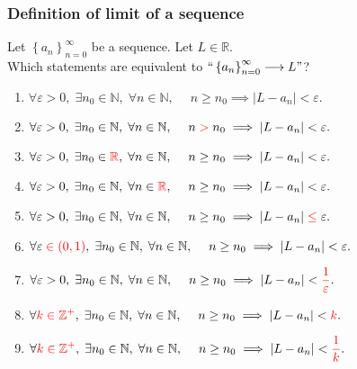 \documentclass[14pt]{beamer}
\begin{document}
	\begin{frame}[t]
		\fontsize{13}{13}\selectfont
		\frametitle{Definition of limit of a sequence}

		Let $\displaystyle \left\{ a_{n} \right\}_{n=0}^{\infty}$ be a sequence. Let
		$\displaystyle L \in \mathbb{R}$. \\ Which statements are equivalent to $\displaystyle
		``\left\{ a_{n} \right\}_{n=0}^{\infty}\longrightarrow L"$?

		\begin{enumerate}
			\item $\displaystyle \forall \varepsilon>0, \; \exists n_{0}\in \mathbb{N},
				\; \forall n \in \mathbb{N}, \; \quad n \geq n_{0}\implies |L-a_{n}| < \varepsilon
				.$

			\item $\displaystyle \forall \varepsilon>0, \; \exists n_{0}\in \mathbb{N},
				\; \forall n \in \mathbb{N}, \; \quad n \;{\color{red} > }\; n_{0}\implies
				|L-a_{n}| < \varepsilon.$

			\item $\displaystyle \forall \varepsilon>0, \; \exists n_{0}\in{\color{red} \mathbb{R}}
				, \; \forall n \in \mathbb{N}, \; \quad n \geq n_{0}\implies |L-a_{n}| <
				\varepsilon.$

			\item $\displaystyle \forall \varepsilon>0, \; \exists n_{0}\in \mathbb{N},
				\; \forall n \in{\color{red} \mathbb{R}}, \; \quad n \geq n_{0}\implies |
				L-a_{n}| < \varepsilon.$

			\item $\displaystyle \forall \varepsilon>0, \; \exists n_{0}\in \mathbb{N},
				\; \forall n \in \mathbb{N}, \; \quad n \geq n_{0}\implies |L-a_{n}| \;{\color{red} \leq}
				\; \varepsilon.$

			\item $\displaystyle \forall \varepsilon \;{\color{red} \in (0,1)}, \; \exists
				n_{0}\in \mathbb{N}, \; \forall n \in \mathbb{N}, \; \quad n \geq n_{0}\implies
				|L-a_{n}| < \varepsilon.$

			\item $\displaystyle \forall \varepsilon>0, \; \exists n_{0}\in \mathbb{N},
				\; \forall n \in \mathbb{N}, \; \quad n \geq n_{0}\implies |L-a_{n}| <{\color{red} \frac{1}{\varepsilon}}
				.$

			\item $\displaystyle \forall{\color{red} k \in \mathbb{Z}^{+}}, \; \exists
				n_{0}\in \mathbb{N}, \; \forall n \in \mathbb{N}, \; \quad n \geq n_{0}\implies
				|L-a_{n}| <{\color{red} k}.$

			\item $\displaystyle \forall{\color{red} k \in \mathbb{Z}^{+}}, \; \exists
				n_{0}\in \mathbb{N}, \; \forall n \in \mathbb{N}, \; \quad n \geq n_{0}\implies
				|L-a_{n}| <{\color{red} \frac{1}{k}}.$
		\end{enumerate}
	\end{frame}
\end{document}
